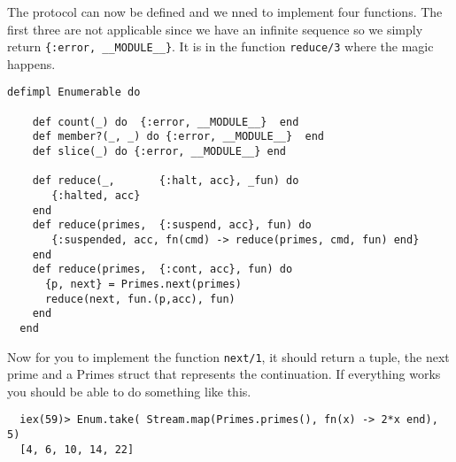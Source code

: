 \documentclass[a4paper,11pt]{article}
\begin{document}
The protocol can now be defined and we nned to implement four
functions. The first three are not applicable since we have an
infinite sequence so we simply return {\tt\{:error, \_\_MODULE\_\_\}}. It
is in the function {\tt reduce/3} where the magic happens.

\begin{verbatim}
defimpl Enumerable do

    def count(_) do  {:error, __MODULE__}  end
    def member?(_, _) do {:error, __MODULE__}  end
    def slice(_) do {:error, __MODULE__} end

    def reduce(_,       {:halt, acc}, _fun) do
       {:halted, acc}
    end
    def reduce(primes,  {:suspend, acc}, fun) do
       {:suspended, acc, fn(cmd) -> reduce(primes, cmd, fun) end}
    end
    def reduce(primes,  {:cont, acc}, fun) do
      {p, next} = Primes.next(primes)
      reduce(next, fun.(p,acc), fun)
    end      
  end
\end{verbatim}

Now for you to implement the function {\tt next/1}, it should return a
tuple, the next prime and a Primes struct that represents the
continuation. If everything works you should be able to do something like this.

\begin{verbatim}
  iex(59)> Enum.take( Stream.map(Primes.primes(), fn(x) -> 2*x end), 5)
  [4, 6, 10, 14, 22]
\end{verbatim}
\end{document}
